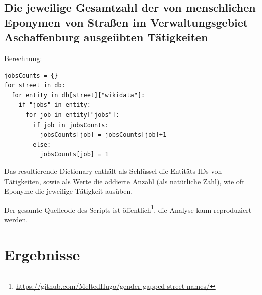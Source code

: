 \documentclass[ngerman,twocolumn,showpacs,%
  nofootinbib,aps,superscriptaddress,%
  eqsecnum,prd,notitlepage,showkeys,10pt,report]{revtex4-2}
\begin{document}
\subsection{Die jeweilige Gesamtzahl der von menschlichen Eponymen von Straßen
im Verwaltungsgebiet Aschaffenburg ausgeübten Tätigkeiten}
Berechnung:
\begin{lstlisting}
jobsCounts = {}
for street in db:
  for entity in db[street]["wikidata"]:
    if "jobs" in entity:
      for job in entity["jobs"]:
        if job in jobsCounts:
          jobsCounts[job] = jobsCounts[job]+1
        else:
          jobsCounts[job] = 1
\end{lstlisting}
Das resultierende Dictionary enthält als Schlüssel die Entitäts-IDs von Tätigkeiten, sowie als
Werte die addierte Anzahl (als natürliche Zahl), wie oft Eponyme die jeweilige Tätigkeit
ausüben.

Der gesamte Quellcode des Scripts ist öffentlich\footnote{\url{https://github.com/MeltedHugo/gender-gapped-street-names/}}, die Analyse kann reproduziert werden.


\section{Ergebnisse}
\end{document}
